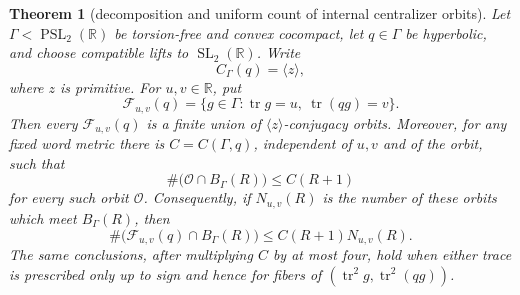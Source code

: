 \documentclass[11pt,reqno]{amsart}
\newtheorem{theorem}{Theorem}[section]
\theoremstyle{definition}
\theoremstyle{remark}
\newcommand{\R}{\mathbb R}
\newcommand{\Tr}{\operatorname{tr}}
\newcommand{\SL}{\operatorname{SL}}
\newcommand{\PSL}{\operatorname{PSL}}
\begin{document}
\begin{theorem}[decomposition and uniform count of internal centralizer orbits]
\label{thm:two-trace-centralizer-orbits}
Let \(\Gamma<\PSL_2(\R)\) be torsion-free and convex cocompact, let
\(q\in\Gamma\) be hyperbolic, and choose compatible lifts to
\(\SL_2(\R)\).  Write
\[
 C_\Gamma(q)=\langle z\rangle,
\]
where \(z\) is primitive.  For \(u,v\in\R\), put
\[
 \mathcal F_{u,v}(q)=
 \{g\in\Gamma:\Tr g=u,\ \Tr(qg)=v\}.
\]
Then every \(\mathcal F_{u,v}(q)\) is a finite union of
\(\langle z\rangle\)-conjugacy orbits.  Moreover, for any fixed word
metric there is \(C=C(\Gamma,q)\), independent of \(u,v\) and of the
orbit, such that
\[
 \#\bigl(\mathcal O\cap B_\Gamma(R)\bigr)\le C(R+1)
\tag{13.10a1}
\]
for every such orbit \(\mathcal O\).  Consequently, if
\(N_{u,v}(R)\) is the number of these orbits which meet \(B_\Gamma(R)\),
then
\[
 \#\bigl(\mathcal F_{u,v}(q)\cap B_\Gamma(R)\bigr)
 \le C(R+1)N_{u,v}(R).
\tag{13.10a2}
\]
The same conclusions, after multiplying \(C\) by at most four, hold when
either trace is prescribed only up to sign and hence for fibers of
\((\Tr^2g,\Tr^2(qg))\).
\end{theorem}
\end{document}
